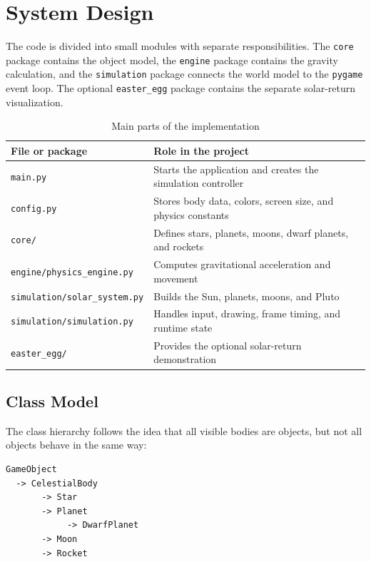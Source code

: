 \documentclass[a4paper,12pt]{article}
\begin{document}
\section{System Design}

The code is divided into small modules with separate responsibilities. The
\texttt{core} package contains the object model, the \texttt{engine} package
contains the gravity calculation, and the \texttt{simulation} package connects
the world model to the \texttt{pygame} event loop. The optional
\texttt{easter\_egg} package contains the separate solar-return visualization.

\begin{table}[H]
    \centering
    \caption{Main parts of the implementation}
    \label{tab:modules}
    \begin{tabular}{ll}
        \toprule
        File or package & Role in the project \\
        \midrule
        \texttt{main.py} & Starts the application and creates the simulation controller \\
        \texttt{config.py} & Stores body data, colors, screen size, and physics constants \\
        \texttt{core/} & Defines stars, planets, moons, dwarf planets, and rockets \\
        \texttt{engine/physics\_engine.py} & Computes gravitational acceleration and movement \\
        \texttt{simulation/solar\_system.py} & Builds the Sun, planets, moons, and Pluto \\
        \texttt{simulation/simulation.py} & Handles input, drawing, frame timing, and runtime state \\
        \texttt{easter\_egg/} & Provides the optional solar-return demonstration \\
        \bottomrule
    \end{tabular}
\end{table}

\subsection{Class Model}

The class hierarchy follows the idea that all visible bodies are objects, but
not all objects behave in the same way:

\begin{verbatim}
GameObject
  -> CelestialBody
       -> Star
       -> Planet
            -> DwarfPlanet
       -> Moon
       -> Rocket
\end{verbatim}
\end{document}

